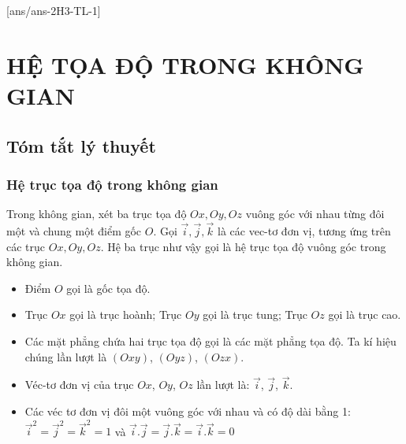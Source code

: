 [ans/ans-2H3-TL-1]
\setcounter{chapter}{2}
\section{HỆ TỌA ĐỘ TRONG KHÔNG GIAN}
\subsection{Tóm tắt lý thuyết}
\begin{tomtat}
	\subsubsection{Hệ trục tọa độ trong không gian}
	Trong không gian, xét ba trục tọa độ $Ox, Oy, Oz$ vuông góc với nhau từng đôi một và chung một điểm gốc $O$. Gọi $\overrightarrow{i}, \overrightarrow{j}, \overrightarrow{k}$ là các vec-tơ đơn vị, tương ứng trên các trục $Ox, Oy, Oz$. Hệ ba trục như vậy gọi là hệ trục tọa độ vuông góc trong không gian.
	\begin{center}
	\end{center}

\begin{itemize}
\item Điểm $O$ gọi là gốc tọa độ.
\item Trục $Ox$ gọi là trục hoành; Trục $Oy$ gọi là trục tung; Trục $Oz$ gọi là trục cao.
\item Các mặt phẳng chứa hai trục tọa độ gọi là các mặt phẳng tọa độ. Ta kí hiệu chúng lần lượt là $\left(Oxy\right)$, $\left(Oyz\right)$, $\left(Ozx\right)$.
\item Véc-tơ đơn vị của trục $Ox$, $Oy$, $Oz$ lần lượt là: $\vec{i}$, $\vec{j}$, $\vec{k}$.
\item Các véc tơ đơn vị đôi một vuông góc với nhau và có độ dài bằng 1:
${\vec{i}}^2={\vec{j}}^2={\vec{k}}^2=1$  và $\vec{i}.\vec{j}=\vec{j}.\vec{k}=\vec{i}.\vec{k}=0$
\end{itemize}

\end{tomtat}

